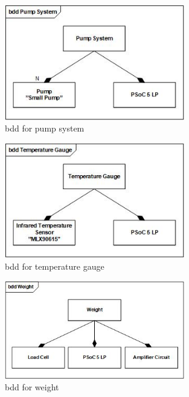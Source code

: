 \begin{figure}[H]
	\centering
	\includegraphics[width=0.7\textwidth, angle = 0]{Images/Hardwarearkitektur/BDD_Pump_System_JPEG.jpg}
	\caption{bdd for pump system}
	\label{fig:bdd_pump}
\end{figure}
\FloatBarrier

\begin{figure}[H]
	\centering
	\includegraphics[width=0.7\textwidth, angle = 0]{Images/Hardwarearkitektur/BDD_Temperature_Gauge_JPEG.jpg}
	\caption{bdd for temperature gauge}
	\label{fig:bdd_temp}
\end{figure}
\FloatBarrier

\begin{figure}[H]
	\centering
	\includegraphics[width=0.7\textwidth, angle = 0]{Images/Hardwarearkitektur/BDD_Weight_JPEG.jpg}
	\caption{bdd for weight}
	\label{fig:bdd_weight}
\end{figure}
\FloatBarrier

